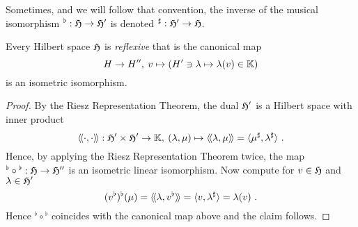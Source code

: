\begin{remark}
  Sometimes, and we will follow that convention, the inverse of the musical isomorphism 
  ${}^\flat: \mathfrak{H} \to \mathfrak{H}'$ is denoted ${}^\sharp: \mathfrak{H}' \to \mathfrak{H}$. 
\end{remark}

\begin{corollary}
  Every Hilbert space $\mathfrak{H}$ is \emph{reflexive} that is the canonical map
  \[ H \to H'' , \: v \mapsto \left( H' \ni \lambda \mapsto \lambda(v) \in \mathbb{K} \right) \]
  is an isometric isomorphism. 
\end{corollary}

\begin{proof}
  By the Riesz Representation Theorem, the dual $\mathfrak{H}'$ is a Hilbert space 
  with inner product  
  \[
    \langle\!\langle \cdot, \cdot  \rangle\!\rangle : \mathfrak{H}' \times \mathfrak{H}' \to \mathbb{K}, \:  
    (\lambda,\mu)   \mapsto \langle\!\langle \lambda, \mu \rangle\!\rangle = \langle \mu^\sharp,\lambda^\sharp \rangle \ .
  \] 
  Hence, by applying the Riesz Representation Theorem twice, 
  the map ${}^\flat \circ {}^\flat : \mathfrak{H} \to  \mathfrak{H}''$ is an isometric linear isomorphism. 
  Now compute for $v\in \mathfrak{H}$ and $\lambda \in \mathfrak{H}'$
  \[
     (v^\flat)^\flat (\mu) = \langle\!\langle \lambda, v^\flat \rangle\!\rangle =
     \langle v, \lambda^\sharp \rangle = \lambda (v) \ . 
  \]
  Hence ${}^\flat \circ {}^\flat$ coincides with the canonical map above and the claim
  follows. 
\end{proof}

